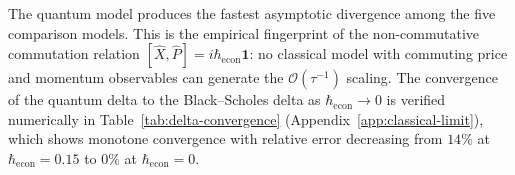 The quantum model produces the fastest asymptotic divergence among the five
comparison models. This is the empirical fingerprint of the
non-commutative commutation relation
$[\hat{X}, \hat{P}] = i \hbar_{\mathrm{econ}} \mathbf{1}$: no classical model
with commuting price and momentum observables can generate the
$\mathcal{O}(\tau^{-1})$ scaling. The convergence of the quantum delta to
the Black--Scholes delta as $\hbar_{\mathrm{econ}} \to 0$ is verified
numerically in Table~\ref{tab:delta-convergence} (Appendix~\ref{app:classical-limit}),
which shows monotone convergence with relative error decreasing from
$14\%$ at $\hbar_{\mathrm{econ}} = 0.15$ to $0\%$ at $\hbar_{\mathrm{econ}} = 0$.
